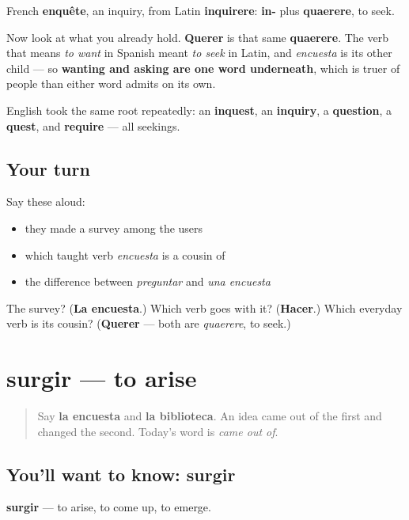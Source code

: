 \begin{cousinweb}
French \textbf{enquête}, an inquiry, from Latin \textbf{inquirere}: \textbf{in-} plus \textbf{quaerere}, to seek.

Now look at what you already hold. \textbf{Querer} is that same \textbf{quaerere}. The verb that means \emph{to want} in Spanish meant \emph{to seek} in Latin, and \emph{encuesta} is its other child — so \textbf{wanting and asking are one word underneath}, which is truer of people than either word admits on its own.

English took the same root repeatedly: an \textbf{inquest}, an \textbf{inquiry}, a \textbf{question}, a \textbf{quest}, and \textbf{require} — all seekings.
\end{cousinweb}

\subsection*{Your turn}
Say these aloud:

\begin{itemize}
\raggedright
  \item they made a survey among the users
  \item which taught verb \emph{encuesta} is a cousin of
  \item the difference between \emph{preguntar} and \emph{una encuesta}
\end{itemize}

\begin{tcolorbox}[breakable,colback=teal!4,colframe=teal!35!black,title={Before you move on}]
The survey? (\textbf{La encuesta}.) Which verb goes with it? (\textbf{Hacer}.) Which everyday verb is its cousin? (\textbf{Querer} — both are \emph{quaerere}, to seek.)
\end{tcolorbox}
\section[surgir]{surgir — to arise}

\label{lesson:ES-C472-surgir}



\begin{quote}
Say \textbf{la encuesta} and \textbf{la biblioteca}. An idea came out of the first and changed the second. Today's word is \emph{came out of}.
\end{quote}

\subsection*{You'll want to know: surgir}
\textbf{surgir} — to arise, to come up, to emerge.

